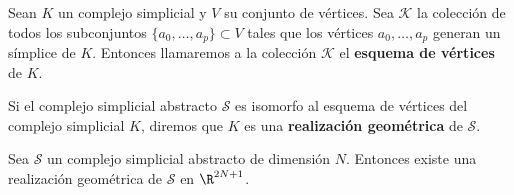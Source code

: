 \begin{definicion}
	Sean \(K\) un complejo simplicial y \(V\) su conjunto de vértices. Sea
	\(\mathcal{K}\) la colección de todos los subconjuntos
	\(\{a_{0}, \ldots, a_{p}\} \subset V\) tales que los vértices
	\(a_{0}, \ldots, a_{p}\) generan un símplice de \(K\). Entonces llamaremos a la colección
	\(\mathcal{K}\) el \textbf{esquema de vértices} de \(K\).
\end{definicion}
\begin{definicion}
	Si el complejo simplicial abstracto \(\mathcal{S}\) es isomorfo al esquema de vértices
	del complejo simplicial \(K\), diremos que \(K\) es una \textbf{realización
	geométrica} de \(\mathcal{S}\).
\end{definicion}
\begin{proposicion}
	Sea \(\mathcal{S}\) un complejo simplicial abstracto de dimensión \(N\). Entonces
	existe una realización geométrica de \(\mathcal{S}\) en \(\R^{2N+1}\).
\end{proposicion}
